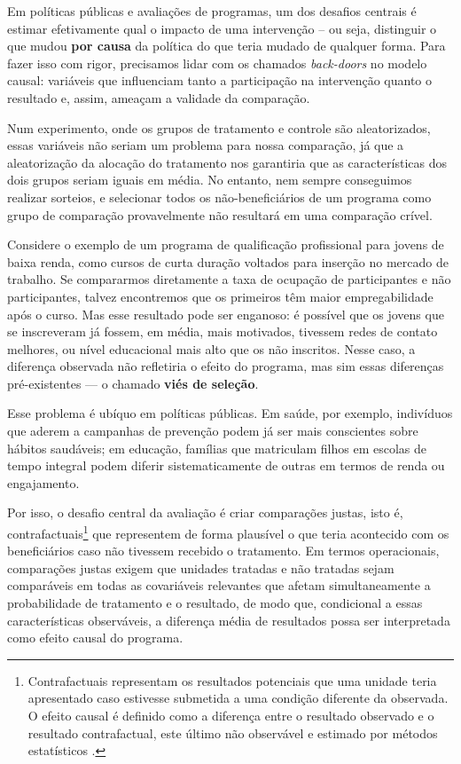 Em políticas públicas e avaliações de programas, um dos desafios centrais é estimar efetivamente qual o impacto de uma intervenção -- ou seja, distinguir o que mudou \textbf{por causa} da política do que teria mudado de qualquer forma. Para fazer isso com rigor, precisamos lidar com os chamados \textit{back-doors} no modelo causal: variáveis que influenciam tanto a participação na intervenção quanto o resultado e, assim, ameaçam a validade da comparação. 

Num experimento, onde os grupos de tratamento e controle são aleatorizados, essas variáveis não seriam um problema para nossa comparação, já que a aleatorização da alocação do tratamento nos garantiria que as características dos dois grupos seriam iguais em média. No entanto, nem sempre conseguimos realizar sorteios, e selecionar todos os não-beneficiários de um programa como grupo de comparação provavelmente não resultará em uma comparação crível. 

Considere o exemplo de um programa de qualificação profissional para jovens de baixa renda, como cursos de curta duração voltados para inserção no mercado de trabalho. Se compararmos diretamente a taxa de ocupação de participantes e não participantes, talvez encontremos que os primeiros têm maior empregabilidade após o curso.  Mas esse resultado pode ser enganoso: é possível que os jovens que se inscreveram já fossem, em média, mais motivados, tivessem redes de contato melhores, ou nível educacional mais alto que os não inscritos. Nesse caso, a diferença observada não refletiria o efeito do programa, mas sim essas diferenças pré-existentes — o chamado \textbf{viés de seleção}.  

Esse problema é ubíquo em políticas públicas. Em saúde, por exemplo, indivíduos que aderem a campanhas de prevenção podem já ser mais conscientes sobre hábitos saudáveis; em educação, famílias que matriculam filhos em escolas de tempo integral podem diferir sistematicamente de outras em termos de renda ou engajamento. 

Por isso, o desafio central da avaliação é criar comparações justas, isto é, contrafactuais\footnote{Contrafactuais representam os resultados potenciais que uma unidade teria apresentado caso estivesse submetida a uma condição diferente da observada. O efeito causal é definido como a diferença entre o resultado observado e o resultado contrafactual, este último não observável e estimado por métodos estatísticos \citep{ImbensRubin2015}.} que representem de forma plausível o que teria acontecido com os beneficiários caso não tivessem recebido o tratamento. Em termos operacionais, comparações justas exigem que unidades tratadas e não tratadas sejam comparáveis em todas as covariáveis relevantes que afetam simultaneamente a probabilidade de tratamento e o resultado, de modo que, condicional a essas características observáveis, a diferença média de resultados possa ser interpretada como efeito causal do programa.

